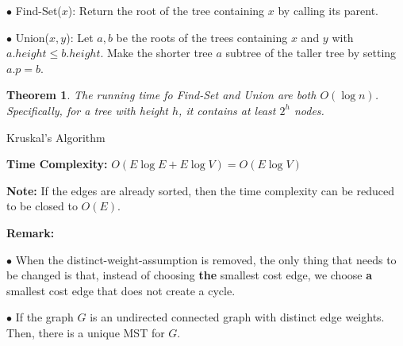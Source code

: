 \documentclass[10pt]{article}
\newtheorem*{theorem}{Theorem}
\begin{document}
$\bullet$ Find-Set($x$): Return the root of the tree containing $x$ by calling its parent.

$\bullet$ Union($x, y$): Let $a, b$ be the roots of the trees containing $x$ and $y$ with $a.height \leq b.height$. Make the shorter tree $a$ subtree of the taller tree by setting $a.p = b$.

\begin{theorem}
	The running time fo Find-Set and Union are both $O(\log n)$. Specifically, for a tree with height $h$, it contains at least $2^h$ nodes.
\end{theorem}

\begin{algorithm}
	\SetAlgoLined
	
	\caption{Kruskal's Algorithm}

\end{algorithm}

\textbf{Time Complexity:} $O(E\log E + E\log V) = O(E\log V)$

\textbf{Note:} If the edges are already sorted, then the time complexity can be reduced to be closed to $O(E)$.

\textbf{Remark:}

$\bullet$ When the distinct-weight-assumption is removed, the only thing that needs to be changed is that, instead of choosing \textbf{the} smallest cost edge, we choose \textbf{a} smallest cost edge that does not create a cycle.

$\bullet$ If the graph $G$ is an undirected connected graph with distinct edge weights. Then, there is a unique MST for $G$.
\end{document}
